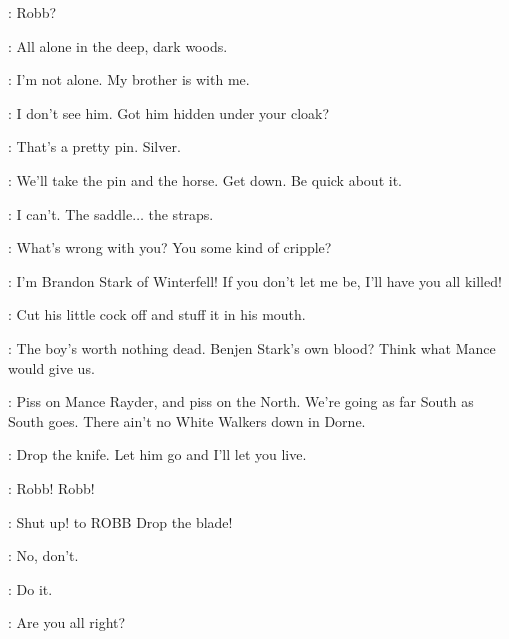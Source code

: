 \BRAN:  Robb? 

\OSHA:  All alone in the deep, dark woods. 

\BRAN:  I'm not alone. My brother is with me. 

\WILDLINGa:  I don't see him. Got him hidden under your cloak? 

\OSHA:  That's a pretty pin. Silver. 

\WILDLINGa:  We'll take the pin and the horse.  Get down. Be quick about it. 

\BRAN:  I can't.  The saddle$\ldots$ the straps. 


\WILDLINGa: What's wrong with you? You some kind of cripple? 

\BRAN:  I'm Brandon Stark of Winterfell! If you don't let me be, I'll have you all killed! 


\WILDLINGb:  Cut his little cock off and stuff it in his mouth. 

\OSHA:  The boy's worth nothing dead.  Benjen Stark's own blood? Think what Mance would give us. 

\WILDLINGa: Piss on Mance Rayder, and piss on the North. We're going as far South as South goes. There ain't no White Walkers down in Dorne. 


\ROBB:  Drop the knife. Let him go and I'll let you live. 


\BRAN:  Robb! Robb! 

\WILDLINGa:   Shut up! to ROBB Drop the blade! 

\BRAN:  No, don't. 

\WILDLINGa:  Do it. 



\ROBB:  Are you all right? 

